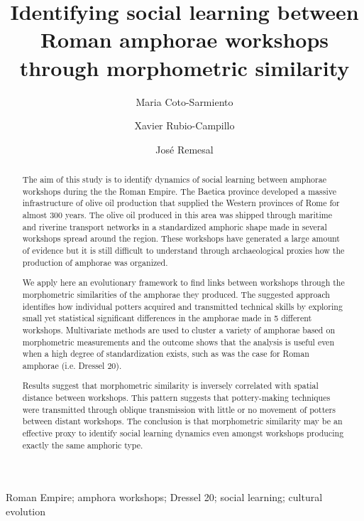 \documentclass[review]{elsarticle}
\begin{document}
\begin{frontmatter}

\title{Identifying social learning between Roman amphorae workshops through morphometric similarity}


\author[bscadress,ceipacadress]{Maria Coto-Sarmiento}


\author[edadress]{Xavier Rubio-Campillo}
\author[ceipacadress]{Jos\'e Remesal}


\address[bscadress]{Barcelona Supercomputing Center (BSC), Jordi Girona 29, Office 3A, Nexus II Building, 08034, Barcelona, Spain}
\address[edadress]{School of History, Classic \& Archaeology, Room OOM.33, William Robertson Wing, Old Medical School, Teviot Place, University of Edinburgh, UK}
\address[ceipacadress]{CEIPAC, Department of Prehistory and Archaeology, Montalegre, 6-8, 08001, University of Barcelona, Barcelona, Spain}

\begin{abstract}

The aim of this study is to identify dynamics of social learning between amphorae workshops during the the Roman Empire. The Baetica province developed a massive infrastructure of olive oil production that supplied the Western provinces of Rome for almost 300 years. The olive oil produced in this area was shipped through maritime and riverine transport networks in a standardized amphoric shape made in several workshops spread around the region. These workshops have generated a large amount of evidence but it is still difficult to understand through archaeological proxies how the production of amphorae was organized.

We apply here an evolutionary framework to find links between workshops through the morphometric similarities of the amphorae they produced. The suggested approach identifies how individual potters acquired and transmitted technical skills by exploring small yet statistical significant differences in the amphorae made in 5 different workshops. Multivariate methods are used to cluster a variety of amphorae based on morphometric measurements and the outcome shows that the analysis is useful even when a high degree of standardization exists, such as was the case for Roman amphorae (i.e. Dressel 20).

Results suggest that morphometric similarity is inversely correlated with spatial distance between workshops. This pattern suggests that pottery-making techniques were transmitted through oblique transmission with little or no movement of potters between distant workshops. The conclusion is that morphometric similarity may be an effective proxy to identify social learning dynamics even amongst workshops producing exactly the same amphoric type. 

\end{abstract}


\begin{keyword}
Roman Empire; amphora workshops; Dressel 20; social learning; cultural evolution
\end{keyword}

\end{frontmatter}
\end{document}
